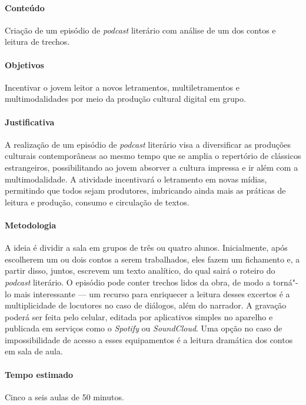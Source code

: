 \documentclass[11pt]{extarticle}
\begin{document}
\paragraph{Conteúdo}
Criação de um episódio de \emph{podcast} literário com análise de um dos
contos e leitura de trechos.


\paragraph{Objetivos}
Incentivar o jovem leitor a novos letramentos, multiletramentos e
multimodalidades por meio da produção cultural digital em grupo.

\paragraph{Justificativa}
A realização de um episódio de \emph{podcast} literário visa a
diversificar as produções culturais contemporâneas ao mesmo tempo que se
amplia o repertório de clássicos estrangeiros, possibilitando ao jovem
absorver a cultura impressa e ir além com a multimodalidade. A atividade
incentivará o letramento em novas mídias, permitindo que todos sejam
produtores, imbricando ainda mais as práticas de leitura e produção,
consumo e circulação de textos.

\paragraph{Metodologia}
A ideia é dividir a sala em grupos de três ou quatro alunos.
Inicialmente, após escolherem um ou dois contos a serem trabalhados,
eles fazem um fichamento e, a partir disso, juntos, escrevem um
texto analítico, do qual sairá o roteiro do \emph{podcast} literário. O
episódio pode conter trechos lidos da obra, de modo a torná"-lo mais
interessante --- um recurso para enriquecer a leitura desses excertos é
a multiplicidade de locutores no caso de diálogos, além do narrador. A
gravação poderá ser feita pelo celular, editada por aplicativos simples
no aparelho e publicada em serviços como o \emph{Spotify} ou
\emph{SoundCloud}. Uma opção no caso de impossibilidade de acesso a
esses equipamentos é a leitura dramática dos contos em sala de aula.

\paragraph{Tempo estimado} Cinco a seis aulas de 50 minutos.
\end{document}
